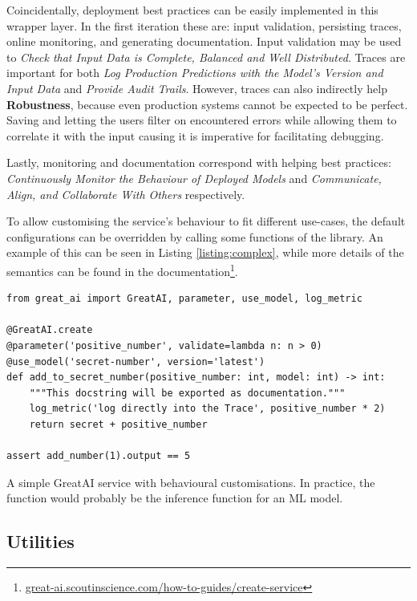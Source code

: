 Coincidentally, deployment best practices can be easily implemented in this wrapper layer. In the first iteration these are: input validation, persisting traces, online monitoring, and generating documentation. Input validation may be used to \textit{Check that Input Data is Complete, Balanced and Well Distributed}. Traces are important for both \textit{Log Production Predictions with the Model's Version and Input Data} and \textit{Provide Audit Trails}. However, traces can also indirectly help \textbf{Robustness}, because even production systems cannot be expected to be perfect. Saving and letting the users filter on encountered errors while allowing them to correlate it with the input causing it is imperative for facilitating debugging.

Lastly, monitoring and documentation correspond with helping best practices: \textit{Continuously Monitor the Behaviour of Deployed Models} and \textit{Communicate, Align, and Collaborate With Others} respectively.

To allow customising the service's behaviour to fit different use-cases, the default configurations can be overridden by calling some functions of the library. An example of this can be seen in Listing \ref{listing:complex}, while more details of the semantics can be found in the documentation\footnote{\href{https://great-ai.scoutinscience.com/how-to-guides/create-service/}{great-ai.scoutinscience.com/how-to-guides/create-service}}.

\begin{listing}[!ht]
\begin{verbatim}
from great_ai import GreatAI, parameter, use_model, log_metric

@GreatAI.create
@parameter('positive_number', validate=lambda n: n > 0)
@use_model('secret-number', version='latest')
def add_to_secret_number(positive_number: int, model: int) -> int:
    """This docstring will be exported as documentation."""
    log_metric('log directly into the Trace', positive_number * 2)
    return secret + positive_number

assert add_number(1).output == 5
\end{verbatim}
\caption{A simple GreatAI service with behavioural customisations. In practice, the function would probably be the inference function for an ML model.}
\label{listing:complex}
\end{listing}

\subsection{Utilities}

